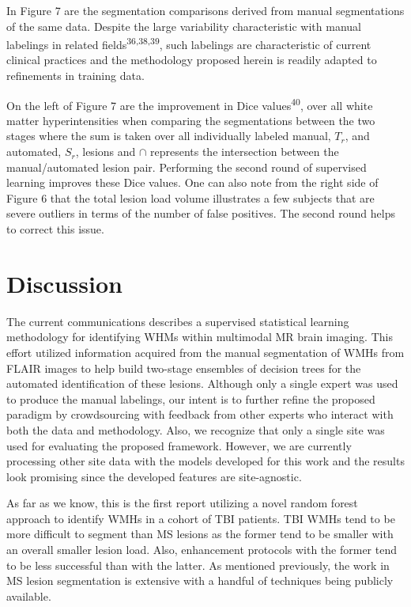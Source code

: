 \documentclass[11pt,]{article}
\begin{document}
In Figure 7 are the segmentation comparisons derived from manual
segmentations of the same data. Despite the large variability
characteristic with manual labelings in related
fields\textsuperscript{36,38,39}, such labelings are characteristic of
current clinical practices and the methodology proposed herein is
readily adapted to refinements in training data.

On the left of Figure 7 are the improvement in Dice
values\textsuperscript{40}, over all white matter hyperintensities when
comparing the segmentations between the two stages where the sum is
taken over all individually labeled manual, \(T_r\), and automated,
\(S_r\), lesions and \(\cap\) represents the intersection between the
manual/automated lesion pair. Performing the second round of supervised
learning improves these Dice values. One can also note from the right
side of Figure 6 that the total lesion load volume illustrates a few
subjects that are severe outliers in terms of the number of false
positives. The second round helps to correct this issue.

\section{Discussion}\label{discussion}

The current communications describes a supervised statistical learning
methodology for identifying WHMs within multimodal MR brain imaging.
This effort utilized information acquired from the manual segmentation
of WMHs from FLAIR images to help build two-stage ensembles of decision
trees for the automated identification of these lesions. Although only a
single expert was used to produce the manual labelings, our intent is to
further refine the proposed paradigm by crowdsourcing with feedback from
other experts who interact with both the data and methodology. Also, we
recognize that only a single site was used for evaluating the proposed
framework. However, we are currently processing other site data with the
models developed for this work and the results look promising since the
developed features are site-agnostic.

As far as we know, this is the first report utilizing a novel random
forest approach to identify WMHs in a cohort of TBI patients. TBI WMHs
tend to be more difficult to segment than MS lesions as the former tend
to be smaller with an overall smaller lesion load. Also, enhancement
protocols with the former tend to be less successful than with the
latter. As mentioned previously, the work in MS lesion segmentation is
extensive with a handful of techniques being publicly available.
\end{document}
